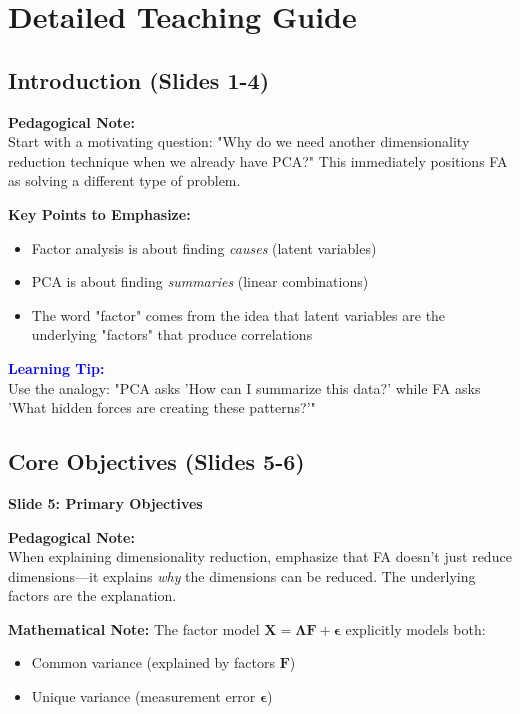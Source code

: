 \documentclass[11pt,a4paper]{article}
\newenvironment{pedagogicalnote}{%
  \begin{framed}
  \noindent\textbf{Pedagogical Note:}\\
}{\end{framed}}
\newenvironment{learningtip}{%
  \begin{framed}
  \noindent\textcolor{blue}{\textbf{Learning Tip:}}\\
}{\end{framed}}
\begin{document}
\section{Detailed Teaching Guide}

\subsection{Introduction (Slides 1-4)}

\begin{pedagogicalnote}
Start with a motivating question: "Why do we need another dimensionality reduction technique when we already have PCA?" This immediately positions FA as solving a different type of problem.
\end{pedagogicalnote}

\textbf{Key Points to Emphasize:}
\begin{itemize}
    \item Factor analysis is about finding \textit{causes} (latent variables)
    \item PCA is about finding \textit{summaries} (linear combinations)
    \item The word "factor" comes from the idea that latent variables are the underlying "factors" that produce correlations
\end{itemize}

\begin{learningtip}
Use the analogy: "PCA asks 'How can I summarize this data?' while FA asks 'What hidden forces are creating these patterns?'"
\end{learningtip}

\subsection{Core Objectives (Slides 5-6)}

\textbf{Slide 5: Primary Objectives}

\begin{pedagogicalnote}
When explaining dimensionality reduction, emphasize that FA doesn't just reduce dimensions—it explains \textit{why} the dimensions can be reduced. The underlying factors are the explanation.
\end{pedagogicalnote}

\textbf{Mathematical Note:} The factor model $\mathbf{X} = \mathbf{\Lambda F} + \mathbf{\epsilon}$ explicitly models both:
\begin{itemize}
    \item Common variance (explained by factors $\mathbf{F}$)
    \item Unique variance (measurement error $\mathbf{\epsilon}$)
\end{itemize}
\end{document}
